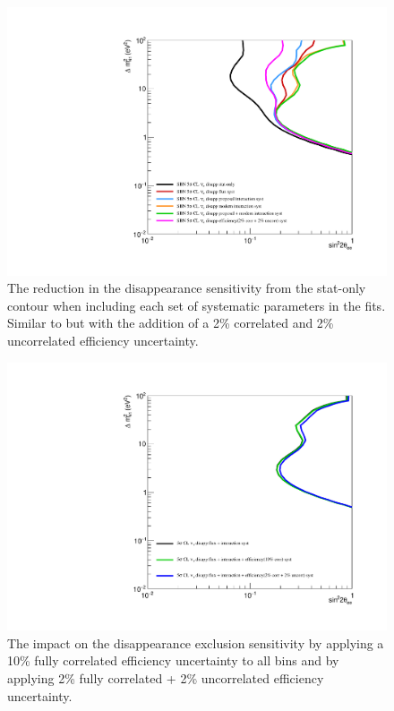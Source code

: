 \begin{figure}[h!]
    \centering
    \includegraphics[width = \largefigwidth]{figures-chap6/exclusion_contours/nue_disapp_syst_groups+det.pdf}
     \caption[\nue disapp sensitivity reduction from different systematic groups with a (2+2)\% efficiency uncertainty.]{The reduction in the \nue disappearance sensitivity from the stat-only contour when including each set of systematic parameters in the fits. Similar to  but with the addition of a 2\% correlated and 2\% uncorrelated efficiency uncertainty.}
    \label{fig:nue_disapp_syst_groups}
\end{figure}

\begin{figure}[h!]
    \centering
    \includegraphics[width = \largefigwidth]{figures-chap6/exclusion_contours/efficiency_systematics/nue_disapp_cor_uncor.pdf}
    \caption[Impact of correlated and uncorrelated efficiency systematics on the \nue disappearance sensitivity.]{The impact on the \nue disappearance exclusion sensitivity by applying a 10\% fully correlated efficiency uncertainty to all bins and by applying 2\% fully correlated + 2\% uncorrelated efficiency uncertainty.}
    \label{fig:my_label}
\end{figure}

